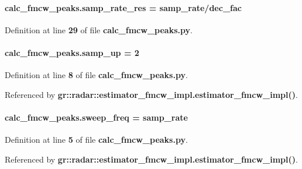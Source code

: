\paragraph[{samp\+\_\+rate\+\_\+res}]{\setlength{\rightskip}{0pt plus 5cm}calc\+\_\+fmcw\+\_\+peaks.\+samp\+\_\+rate\+\_\+res = {\bf samp\+\_\+rate}/{\bf dec\+\_\+fac}}\label{namespacecalc__fmcw__peaks_a877f233608fb5f045688ca64804d97c2}


Definition at line {\bf 29} of file {\bf calc\+\_\+fmcw\+\_\+peaks.\+py}.

\paragraph[{samp\+\_\+up}]{ calc\+\_\+fmcw\+\_\+peaks.\+samp\+\_\+up = 2}\label{namespacecalc__fmcw__peaks_a3032f7aeb346b344cfb65a004182b762}


Definition at line {\bf 8} of file {\bf calc\+\_\+fmcw\+\_\+peaks.\+py}.



Referenced by {\bf gr\+::radar\+::estimator\+\_\+fmcw\+\_\+impl.\+estimator\+\_\+fmcw\+\_\+impl()}.

\paragraph[{sweep\+\_\+freq}]{\setlength{\rightskip}{0pt plus 5cm}calc\+\_\+fmcw\+\_\+peaks.\+sweep\+\_\+freq = {\bf samp\+\_\+rate}}\label{namespacecalc__fmcw__peaks_a0b9fb63f1447fb79fe641a8af76bf6f4}


Definition at line {\bf 5} of file {\bf calc\+\_\+fmcw\+\_\+peaks.\+py}.



Referenced by {\bf gr\+::radar\+::estimator\+\_\+fmcw\+\_\+impl.\+estimator\+\_\+fmcw\+\_\+impl()}.

